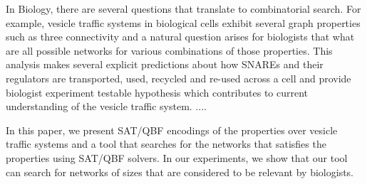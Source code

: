 In Biology, there are several questions that translate to combinatorial 
search.
%
For example, vesicle traffic systems in biological cells exhibit
several graph properties such as three connectivity and
a natural question arises for biologists that what are all possible
networks for various combinations of those properties.
%
This analysis makes several explicit predictions about how SNAREs and their regulators are transported, used, recycled and re-used across a cell and provide biologist experiment testable hypothesis which contributes to current understanding of the vesicle traffic system. ....

%
In this paper, we present SAT/QBF encodings of the properties over
vesicle traffic systems and a tool that searches for the networks
that satisfies the properties using SAT/QBF solvers.
%
In our experiments, we show that our tool can search for networks of
sizes that are considered to be relevant by biologists.



